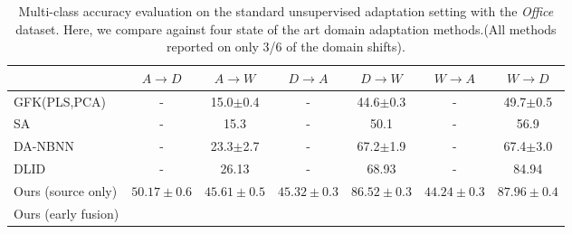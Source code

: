 \begin{table*}
  \setlength{\tabcolsep}{4pt}
  \small
\centering
\begin{tabular}{lcccccc}
\toprule
                     & $A \rightarrow D$   & $A \rightarrow W$   & $D \rightarrow A$   & $D \rightarrow W$   & $W \rightarrow A$   & $W \rightarrow D$   \\
\midrule
GFK(PLS,PCA)~\cite{gong-cvpr12} & - & 15.0$\pm$0.4 & - & 44.6$\pm$0.3 & - & 49.7$\pm$0.5\\
SA~\cite{fernando-iccv13} & - & 15.3 & - & 50.1& - & 56.9\\
DA-NBNN~\cite{da-nbnn} & - & 23.3$\pm$2.7 & - & 67.2$\pm$1.9 & - & 67.4$\pm$3.0\\
DLID~\cite{ref:dlid} & - & 26.13 & - & 68.93 & - & 84.94\\                     
\midrule
 Ours (source only)   & $50.17 \pm 0.6$     & $45.61 \pm 0.5$     & $45.32 \pm 0.3$     & $\bm{86.52 \pm 0.3}$     & $44.24 \pm 0.3$     & $87.96 \pm 0.4$     \\
Ours (early fusion)&      \\
\bottomrule
\end{tabular}

\caption{Multi-class accuracy evaluation on the standard unsupervised adaptation setting with the \emph{Office} dataset. Here, we compare against four state of the art domain adaptation methods.(All methods reported on only 3/6 of the domain shifts).}
\label{table:full-unsuper}
\end{table*}

